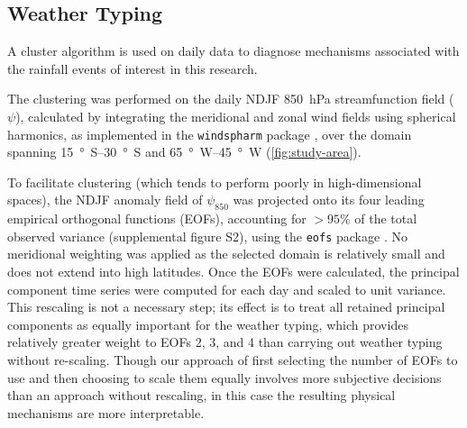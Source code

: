 \documentclass[twocol]{ametsoc}
\begin{document}
\subsection{Weather Typing} \label{sec:weather-typing}

A cluster algorithm is used on daily data to diagnose mechanisms associated with the rainfall events of interest in this research.

The clustering was performed on the daily NDJF \SI{850}{\hecto\pascal} streamfunction field ($\psi$), calculated by integrating the meridional and zonal wind fields using spherical harmonics, as implemented in the \texttt{windspharm} package \citep{Dawson:2016ws,Adams:1999fb}, over the domain spanning \SIrange{15}{30}{\degree S} and \SIrange{65}{45}{\degree W} (\cref{fig:study-area}).

To facilitate clustering (which tends to perform poorly in high-dimensional spaces), the NDJF anomaly field of $\psi_{850}$ was projected  onto its four leading empirical orthogonal functions (EOFs), accounting for $>95\%$ of the total observed variance (supplemental figure S2), using the \texttt{eofs} package \citep{Dawson:2016ge}.
No meridional weighting was applied as the selected domain is relatively small and does not extend into high latitudes.
Once the EOFs were calculated, the principal component time series were computed for each day and scaled to unit variance.
This rescaling is not a necessary step; its effect is to treat all retained principal components as equally important for the weather typing, which provides relatively greater weight to EOFs 2, 3, and 4 than carrying out weather typing without re-scaling.
Though our approach of first selecting the number of EOFs to use and then choosing to scale them equally involves more subjective decisions than an approach without rescaling, in this case the resulting physical mechanisms are more interpretable.
\end{document}

